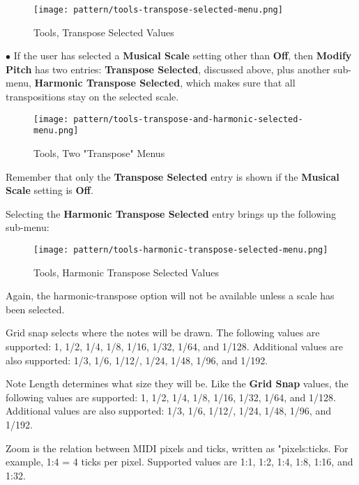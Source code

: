 \begin{figure}[H]
   \centering 
   \texttt{[image: pattern/tools-transpose-selected-menu.png]}
   \caption{Tools, Transpose Selected Values}
   \label{fig:pattern_editor_tools_transpose_selected_menu}
\end{figure}

   $\bullet$ If the user has selected a
   \textbf{Musical Scale} setting other than \textbf{Off},
   then \textbf{Modify Pitch} has two entries:
   \textbf{Transpose Selected}, discussed above, plus
   another sub-menu,
   \textbf{Harmonic Transpose Selected}, which makes sure that all
   transpositions stay on the selected scale.

\begin{figure}[H]
   \centering 
   \texttt{[image: pattern/tools-transpose-and-harmonic-selected-menu.png]}
   \caption{Tools, Two "Transpose" Menus}
   \label{fig:pattern_editor_tools_two_transpose_menus}
\end{figure}

   Remember that only the 
   \textbf{Transpose Selected} entry is shown if the \textbf{Musical Scale}
   setting is \textbf{Off}.

   Selecting the \textbf{Harmonic Transpose Selected} entry brings up the
   following sub-menu:

\begin{figure}[H]
   \centering 
   \texttt{[image: pattern/tools-harmonic-transpose-selected-menu.png]}
   \caption{Tools, Harmonic Transpose Selected Values}
   \label{fig:pattern_editor_tools_harmonic_transpose_menu}
\end{figure}

   Again, the harmonic-transpose option will not be available unless a scale
   has been selected.

   Grid snap selects where the notes will be drawn.
   The following values are supported:
   1, 1/2, 1/4, 1/8, 1/16, 1/32, 1/64, and 1/128.
   Additional values are also supported:
   1/3, 1/6, 1/12/, 1/24, 1/48, 1/96, and 1/192.

   Note Length determines what size they will be.
   Like the \textbf{Grid Snap} values,
   the following values are supported:
   1, 1/2, 1/4, 1/8, 1/16, 1/32, 1/64, and 1/128.
   Additional values are also supported:
   1/3, 1/6, 1/12/, 1/24, 1/48, 1/96, and 1/192.

   Zoom is the relation between MIDI pixels and ticks, written as
   "pixels:ticks.
   For example, 1:4 = 4 ticks per pixel.
   Supported values are 1:1, 1:2, 1:4, 1:8, 1:16, and 1:32.

